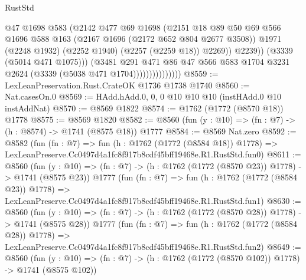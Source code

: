 \begin{lexlean}{RustStd}
\begin{coremodule}
                                  @47
                                  @1698
                                  @583
                                  (@2142
                                    @477
                                    @69
                                    @1698
                                    (@2151
                                      @18
                                      @89
                                      @50
                                      @69
                                      @566
                                      @1696
                                      @588
                                      @163
                                      (@2167 @1696 (@2172 @652 @804 @2677 @3508))
                                      @1971
                                      (@2248 @1932)
                                      (@2252 @1940)
                                      (@2257 (@2259 @18))
                                      @2269))
                                  @2239))
                              (@3339 (@5014 @471 @1075)))
                            (@3481
                              @291
                              @471
                              @86
                              @47
                              @566
                              @583
                              @1704
                              @3231
                              @2624
                              (@3339 (@5038 @471 @1704)))))))))))))))
@8559 := LexLeanPreservation.Rust.CrateOK @1736 @1738 @1740
@8560 := Nat.casesOn.{0}
@8569 := HAdd.hAdd.{0, 0, 0} @10 @10 @10 (instHAdd.{0} @10 instAddNat)
@8570 := @8569 @1822
@8574 := @1762 (@1772 (@8570 @18)) @1778
@8575 := @8569 @1820
@8582 := @8560 (fun (y : @10) => (fn : @7) -> (h : @8574) -> @1741 (@8575 @18)) @1777
@8584 := @8569 Nat.zero
@8592 := @8582
    (fun (fn : @7) =>
    fun (h : @1762 (@1772 (@8584 @18)) @1778) =>
    LexLeanPreserve.Cc0497d4a1fc8f917b8cdf45bff19468e.R1.RustStd.fun0)
@8611 := @8560
    (fun (y : @10) => (fn : @7) -> (h : @1762 (@1772 (@8570 @23)) @1778) -> @1741 (@8575 @23))
    @1777
    (fun (fn : @7) =>
    fun (h : @1762 (@1772 (@8584 @23)) @1778) =>
    LexLeanPreserve.Cc0497d4a1fc8f917b8cdf45bff19468e.R1.RustStd.fun1)
@8630 := @8560
    (fun (y : @10) => (fn : @7) -> (h : @1762 (@1772 (@8570 @28)) @1778) -> @1741 (@8575 @28))
    @1777
    (fun (fn : @7) =>
    fun (h : @1762 (@1772 (@8584 @28)) @1778) =>
    LexLeanPreserve.Cc0497d4a1fc8f917b8cdf45bff19468e.R1.RustStd.fun2)
@8649 := @8560
    (fun (y : @10) => (fn : @7) -> (h : @1762 (@1772 (@8570 @102)) @1778) -> @1741 (@8575 @102))

\end{coremodule}
\end{lexlean}
